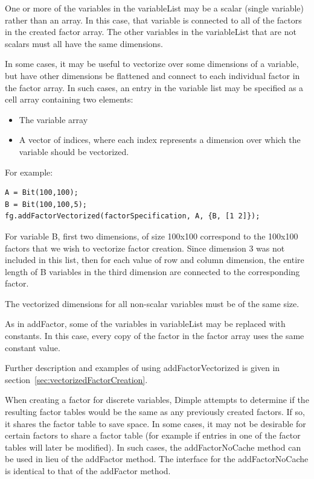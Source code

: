 One or more of the variables in the variableList may be a scalar (single variable) rather than an array.  In this case, that variable is connected to all of the factors in the created factor array.  The other variables in the variableList that are not scalars must all have the same dimensions.

In some cases, it may be useful to vectorize over some dimensions of a variable, but have other dimensions be flattened and connect to each individual factor in the factor array.  In such cases, an entry in the variable list may be specified as a cell array containing two elements:

\begin{itemize}
\item The variable array
\item A vector of indices, where each index represents a dimension over which the variable should be vectorized.
\end{itemize}

For example:
\begin{lstlisting}
A = Bit(100,100);
B = Bit(100,100,5);
fg.addFactorVectorized(factorSpecification, A, {B, [1 2]});
\end{lstlisting}

For variable B, first two dimensions, of size 100x100 correspond to the 100x100 factors that we wish to vectorize factor creation.  Since dimension 3 was not included in this list, then for each value of row and column dimension, the entire length of B variables in the third dimension are connected to the corresponding factor.

The vectorized dimensions for all non-scalar variables must be of the same size.

As in addFactor, some of the variables in variableList may be replaced with constants.  In this case, every copy of the factor in the factor array uses the same constant value.

Further description and examples of using addFactorVectorized is given in section~\ref{sec:vectorizedFactorCreation}.
\fi

\ifmatlab
{}
\label{sec:addFactorNoCache}

When creating a factor for discrete variables, Dimple attempts to determine if the resulting factor tables would be the same as any previously created factors.  If so, it shares the factor table to save space.  In some cases, it may not be desirable for certain factors to share a factor table (for example if entries in one of the factor tables will later be modified).  In such cases, the addFactorNoCache method can be used in lieu of the addFactor method.  The interface for the addFactorNoCache is identical to that of the addFactor method.

